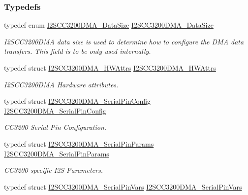 \subsubsection*{Typedefs}
\begin{DoxyCompactItemize}
\item 
typedef enum \hyperlink{_i2_s_c_c3200_d_m_a_8h_a712825340a80cc76e6ce4d6330ca3687}{I2\+S\+C\+C3200\+D\+M\+A\+\_\+\+Data\+Size} \hyperlink{_i2_s_c_c3200_d_m_a_8h_a5ab45b86872218ae89700bf004660b8f}{I2\+S\+C\+C3200\+D\+M\+A\+\_\+\+Data\+Size}
\begin{DoxyCompactList}\small\item\em I2\+S\+C\+C3200\+D\+M\+A data size is used to determine how to configure the D\+M\+A data transfers. This field is to be only used internally. \end{DoxyCompactList}\item 
typedef struct \hyperlink{struct_i2_s_c_c3200_d_m_a___h_w_attrs}{I2\+S\+C\+C3200\+D\+M\+A\+\_\+\+H\+W\+Attrs} \hyperlink{_i2_s_c_c3200_d_m_a_8h_ade664e865841159858d62f74344c10e1}{I2\+S\+C\+C3200\+D\+M\+A\+\_\+\+H\+W\+Attrs}
\begin{DoxyCompactList}\small\item\em I2\+S\+C\+C3200\+D\+M\+A Hardware attributes. \end{DoxyCompactList}\item 
typedef struct \hyperlink{struct_i2_s_c_c3200_d_m_a___serial_pin_config}{I2\+S\+C\+C3200\+D\+M\+A\+\_\+\+Serial\+Pin\+Config} \hyperlink{_i2_s_c_c3200_d_m_a_8h_a2609b03ff79e575eefff8d38e2528bbc}{I2\+S\+C\+C3200\+D\+M\+A\+\_\+\+Serial\+Pin\+Config}
\begin{DoxyCompactList}\small\item\em C\+C3200 Serial Pin Configuration. \end{DoxyCompactList}\item 
typedef struct \hyperlink{struct_i2_s_c_c3200_d_m_a___serial_pin_params}{I2\+S\+C\+C3200\+D\+M\+A\+\_\+\+Serial\+Pin\+Params} \hyperlink{_i2_s_c_c3200_d_m_a_8h_a5d937c5c8567a0863ced5af0d1d19502}{I2\+S\+C\+C3200\+D\+M\+A\+\_\+\+Serial\+Pin\+Params}
\begin{DoxyCompactList}\small\item\em C\+C3200 specific I2\+S Parameters. \end{DoxyCompactList}\item 
typedef struct \hyperlink{struct_i2_s_c_c3200_d_m_a___serial_pin_vars}{I2\+S\+C\+C3200\+D\+M\+A\+\_\+\+Serial\+Pin\+Vars} \hyperlink{_i2_s_c_c3200_d_m_a_8h_ae2bd2cf855752378e22ae2b662df0a72}{I2\+S\+C\+C3200\+D\+M\+A\+\_\+\+Serial\+Pin\+Vars}

\end{DoxyCompactItemize}
